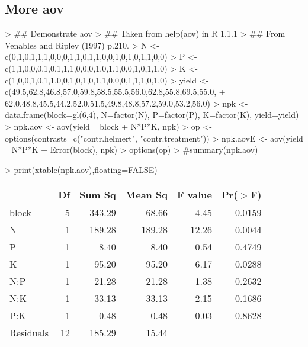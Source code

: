 \documentclass[letterpaper]{article}
\begin{document}
\subsection{More aov}
\begin{Schunk}
\begin{Sinput}
> ## Demonstrate aov
> ## Taken from help(aov) in R 1.1.1
> ## From Venables and Ripley (1997) p.210.
> N <- c(0,1,0,1,1,1,0,0,0,1,1,0,1,1,0,0,1,0,1,0,1,1,0,0)
> P <- c(1,1,0,0,0,1,0,1,1,1,0,0,0,1,0,1,1,0,0,1,0,1,1,0)
> K <- c(1,0,0,1,0,1,1,0,0,1,0,1,0,1,1,0,0,0,1,1,1,0,1,0)
> yield <- c(49.5,62.8,46.8,57.0,59.8,58.5,55.5,56.0,62.8,55.8,69.5,55.0,
+            62.0,48.8,45.5,44.2,52.0,51.5,49.8,48.8,57.2,59.0,53.2,56.0)
> npk <- data.frame(block=gl(6,4), N=factor(N), P=factor(P), K=factor(K), yield=yield)
> npk.aov <- aov(yield ~ block + N*P*K, npk)
> op <- options(contrasts=c("contr.helmert", "contr.treatment"))
> npk.aovE <- aov(yield ~  N*P*K + Error(block), npk)
> options(op)
> #summary(npk.aov)
\end{Sinput}
\end{Schunk}
\begin{Schunk}
\begin{Sinput}
> print(xtable(npk.aov),floating=FALSE)
\end{Sinput}
% latex table generated in R 3.1.1 by xtable 1.7-3 package
% 
\begin{tabular}{lrrrrr}
  \hline
 & Df & Sum Sq & Mean Sq & F value & Pr($>$F) \\ 
  \hline
block & 5 & 343.29 & 68.66 & 4.45 & 0.0159 \\ 
  N & 1 & 189.28 & 189.28 & 12.26 & 0.0044 \\ 
  P & 1 & 8.40 & 8.40 & 0.54 & 0.4749 \\ 
  K & 1 & 95.20 & 95.20 & 6.17 & 0.0288 \\ 
  N:P & 1 & 21.28 & 21.28 & 1.38 & 0.2632 \\ 
  N:K & 1 & 33.13 & 33.13 & 2.15 & 0.1686 \\ 
  P:K & 1 & 0.48 & 0.48 & 0.03 & 0.8628 \\ 
  Residuals & 12 & 185.29 & 15.44 &  &  \\ 
   \hline
\end{tabular}\end{Schunk}
\end{document}
